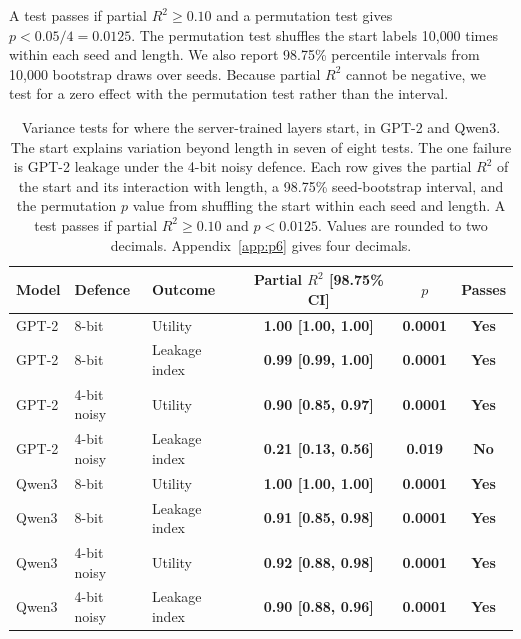 \documentclass[11pt]{article}
\newcommand{\keyresult}[1]{\textbf{\textcolor{resultcol}{#1}}}
\newcommand{\passresult}[1]{\textbf{\textcolor{passcol}{#1}}}
\newcommand{\failresult}[1]{\textbf{\textcolor{failcol}{#1}}}
\begin{document}
A test passes if partial $R^2\geq0.10$ and a permutation test gives $p<0.05/4=0.0125$. The permutation test shuffles the start labels 10{,}000 times within each seed and length. We also report 98.75\% percentile intervals from 10{,}000 bootstrap draws over seeds. Because partial $R^2$ cannot be negative, we test for a zero effect with the permutation test rather than the interval.

\begin{table}[H]
\centering\small
\begin{tabular}{lllccc}
\toprule
Model & Defence & Outcome & Partial $R^2$ [98.75\% CI] & $p$ & Passes \\
\midrule
GPT-2 & 8-bit & Utility & \keyresult{1.00 [1.00, 1.00]} & \passresult{0.0001} & \passresult{Yes} \\
GPT-2 & 8-bit & Leakage index & \keyresult{0.99 [0.99, 1.00]} & \passresult{0.0001} & \passresult{Yes} \\
GPT-2 & 4-bit noisy & Utility & \keyresult{0.90 [0.85, 0.97]} & \passresult{0.0001} & \passresult{Yes} \\
GPT-2 & 4-bit noisy & Leakage index & \failresult{0.21 [0.13, 0.56]} & \failresult{0.019} & \failresult{No} \\
\midrule
Qwen3 & 8-bit & Utility & \keyresult{1.00 [1.00, 1.00]} & \passresult{0.0001} & \passresult{Yes} \\
Qwen3 & 8-bit & Leakage index & \keyresult{0.91 [0.85, 0.98]} & \passresult{0.0001} & \passresult{Yes} \\
Qwen3 & 4-bit noisy & Utility & \keyresult{0.92 [0.88, 0.98]} & \passresult{0.0001} & \passresult{Yes} \\
Qwen3 & 4-bit noisy & Leakage index & \keyresult{0.90 [0.88, 0.96]} & \passresult{0.0001} & \passresult{Yes} \\
\bottomrule
\end{tabular}
\caption{Variance tests for where the server-trained layers start, in GPT-2 and Qwen3. The start explains variation beyond length in seven of eight tests. The one failure is GPT-2 leakage under the 4-bit noisy defence. Each row gives the partial $R^2$ of the start and its interaction with length, a 98.75\% seed-bootstrap interval, and the permutation $p$ value from shuffling the start within each seed and length. A test passes if partial $R^2\geq0.10$ and $p<0.0125$. Values are rounded to two decimals. Appendix~\ref{app:p6} gives four decimals.}
\label{tab:placement}
\end{table}
\end{document}
